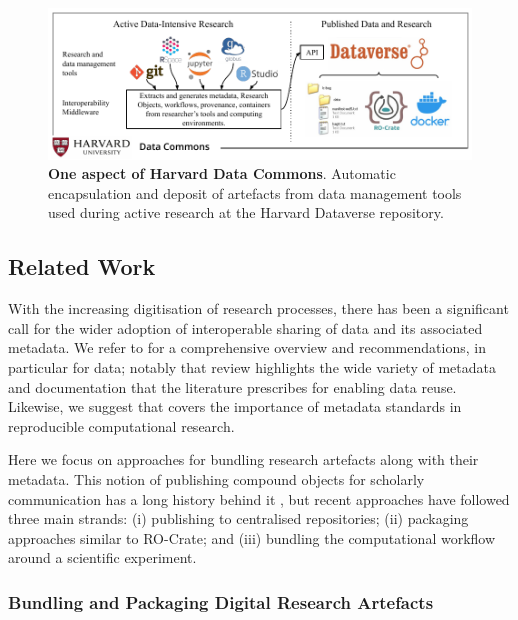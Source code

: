 \begin{figure}%
  \includegraphics[width=1.1\textwidth]{figures/ch05/data-commons-ro-crate-figure-5.pdf}
	\caption[Harvard Data Commons]{\textbf{One aspect of Harvard Data Commons}. Automatic
  encapsulation and deposit of artefacts from data management tools used
  during active research at the Harvard Dataverse repository.}
  \label{ch5:fig:hdc}
\end{figure}

\subsection{Related Work}\label{ch5:relatedwork}

With the increasing digitisation of research processes, there has been a
significant call for the wider adoption of interoperable sharing of data
and its associated metadata. We refer to
\cite{Koesten 2020} for a
comprehensive overview and recommendations, in particular for data;
notably that review highlights the wide variety of metadata and
documentation that the literature prescribes for enabling data reuse.
Likewise, we suggest
\cite{Leipzig 2021} that
covers the importance of metadata standards in reproducible
computational research.

Here we focus on approaches for bundling research artefacts along with
their metadata. This notion of publishing compound objects for scholarly
communication has a long history behind it
\cite{Claerbout 1992,Van de Sompel 2007},
but recent approaches have followed three main strands: (i) publishing to
centralised repositories; (ii) packaging approaches similar to RO-Crate;
and (iii) bundling the computational workflow around a scientific
experiment.

\subsubsection{Bundling and Packaging Digital Research
Artefacts}\label{ch5:bundling-and-packaging-digital-research-artefacts}

